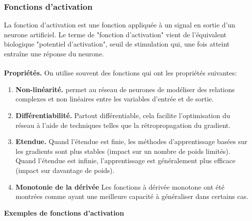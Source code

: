 \documentclass[a4paper]{article}
\begin{document}
\subsubsection{Fonctions d'activation}
La fonction d'activation est une fonction appliquée à un signal en sortie d'un neurone artificiel. Le terme de "fonction d'activation" vient de l'équivalent biologique "potentiel d'activation", seuil de stimulation qui, une fois atteint entraîne une réponse du neurone.
\\
\vspace{2mm}
\\
\textbf{Propriétés. } On utilise souvent des fonctions qui ont les propriétés suivantes:
\begin{enumerate}[label=\textit{(\roman*)}]
    \item \textbf{Non-linéarité.} permet au réseau de neurones de modéliser des relations complexes et non linéaires entre les variables d'entrée et de sortie.
    \item \textbf{Différentiabilité.} Partout différentiable, cela facilite l'optimisation du réseau à l'aide de techniques telles que la rétropropagation du gradient.
    \item \textbf{Etendue.} Quand l'étendue est finie, les méthodes d'apprentissage basées sur les gradients sont plus stables (impact sur un nombre de poids limités). Quand l'étendue est infinie, l'apprentissage est généralement plus efficace (impact sur davantage de poids).
    \item \textbf{Monotonie de la dérivée} Les fonctions à dérivée monotone ont été montrées comme ayant une meilleure capacité à généraliser dans certains cas. 
\end{enumerate} 

\textbf{Exemples de fonctions d'activation} 
\end{document}
